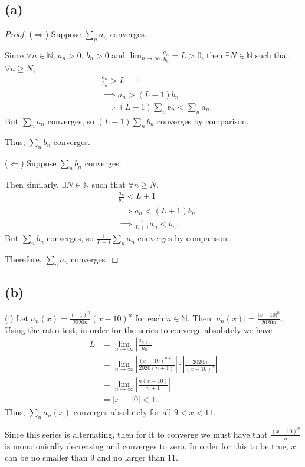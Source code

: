 \documentclass{article}
\newcommand{\N}{\mathbb{N}} %
\begin{document}
\subsection*{(a)}
\begin{proof}
	($\Rightarrow$) Suppose $\sum_n a_n$ converges. 
	
	Since $\forall n \in \N$, $a_n > 0$, $b_n > 0$ and $\lim_{n \to \infty} \frac{a_n}{b_n} = L >0$, then $\exists N \in \N$ such that $\forall n \geq N$,
	\begin{align}
		&\frac{a_n}{b_n} > L - 1 \\
		&\implies a_n > (L-1)b_n \\
		&\implies (L-1)\sum_n b_n < \sum_n a_n.
	\end{align}
	But $\sum_n a_n$ converges, so $(L-1)\sum_n b_n$ converges by comparison.
	
	Thus, $\sum_n b_n$ converges.
	
	($\Leftarrow$) Suppose $\sum_n b_n$ converges.
	
	Then similarly, $\exists N \in \N$ such that $\forall n \geq N$, 
	\begin{align}
		&\frac{a_n}{b_n} < L + 1 \\
		&\implies a_n < (L+1)b_n \\
		&\implies \frac{1}{L+1}a_n < b_n.
	\end{align}
	But $\sum_n b_n$ converges, so $\frac{1}{L+1}\sum_n a_n$ converges by comparison.
	
	Therefore, $\sum_n a_n$ converges.
\end{proof}

\subsection*{(b)}
(i)
Let $a_n(x) = \frac{(-1)^n}{2020n}(x-10)^n$ for each $n \in \N$. Then $|a_n(x)| = \frac{|x-10|^n}{2020n}$. Using the ratio test, in order for the series to converge absolutely we have
\begin{align}
	L &= \lim_{n \to \infty}\left|\frac{a_{n+1}}{a_n}\right| \\
	&= \lim_{n \to \infty} \left|\frac{(x-10)^{n+1}}{2020(n+1)}\right| \cdot \left|\frac{2020n}{(x-10)^n}\right| \\
	&= \lim_{n \to \infty} \left|\frac{n(x-10)}{n+1}\right| \\
	&= |x-10| < 1.
\end{align}
Thus, $\sum_n a_n(x)$ converges absolutely for all $9 < x < 11$.

Since this series is alternating, then for it to converge we must have that $\frac{(x-10)^n}{n}$ is monotonically decreasing and converges to zero. In order for this to be true, $x$ can be no smaller than $9$ and no larger than $11$. 
\end{document}

